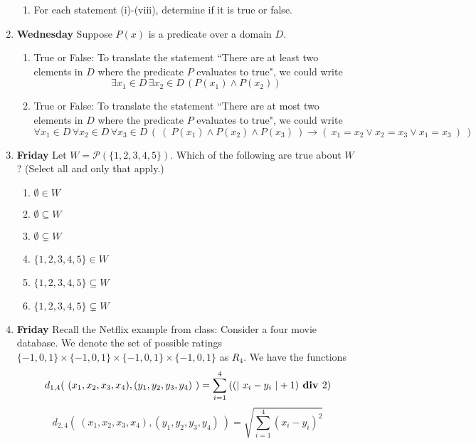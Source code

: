 \documentclass[12pt, oneside]{article}
\begin{document}
\begin{enumerate}
\begin{enumerate}
\item For each  statement (i)-(viii), determine
if  it is true or  false.
\end{enumerate}

\item {\bf Wednesday} Suppose $P(x)$ is  a predicate over a
domain $D$.
\begin{enumerate}
    \item True or False: To translate the statement
    ``There are at least two  elements in $D$
    where the predicate $P$ evaluates to true", we
    could  write
    \[
    \exists  x_1 \in D \, \exists x_2 \in D  \, (P(x_1) \wedge P(x_2))
    \]
    \item True or False: To translate the statement
    ``There are at most two  elements in $D$
    where the predicate $P$ evaluates to true", we
    could write
    \[
    \forall  x_1 \in D \, \forall x_2 \in D \, \forall x_3 \in  D \, \left(~ (~P(x_1) \wedge P(x_2)  \wedge P(x_3) ~) \to (~ x_1 = x_2 \vee x_2 = x_3 \vee x_1 = x_3~)~\right)
    \]

\end{enumerate}


\item {\bf Friday} Let $W = \mathcal{P}(\{1,2,3,4,5\})$.
Which of the following are true  about  $W$? 
(Select all and  only that  apply.)
\begin{multicols}{2}
\begin{enumerate}
    \item $\emptyset  \in W$
    \item $\emptyset \subseteq W$
    \item $\emptyset \subsetneq W$
    \item $\{1,2,3,4,5\} \in W$
    \item $\{1,2,3,4,5\} \subseteq W$
    \item $\{1,2,3,4,5\} \subsetneq W$
\end{enumerate}
\end{multicols}

\item {\bf Friday} Recall the Netflix example from class: Consider a four movie database. We denote the set of possible ratings 
$\{-1,0,1\} \times \{-1,0,1\} \times \{-1,0,1\} \times \{-1,0,1\}$ as $R_4$. We have the functions
\[
d_{1,4}(~ (x_1, x_2, x_3, x_4) , (y_1, y_2, y_3, y_4) ~) =  \sum_{i=1}^4\left( (\lvert~x_i-y_i~\rvert + 1) \textbf{ div } 2 \right)
\]
\[
d_{2,4}(~ (x_1, x_2, x_3, x_4) , (y_1, y_2, y_3, y_4) ~) =  \sqrt{ \sum_{i=1}^4 (x_i - y_i)^2}
\]


\end{enumerate}
\end{document}
